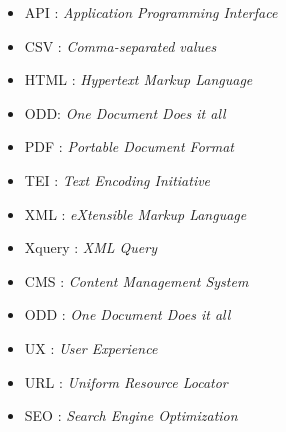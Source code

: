 \begin{itemize}
    \item API : \textit{Application Programming Interface}
    \item CSV : \textit{Comma-separated values}
    \item HTML : \textit{Hypertext Markup Language}
    \item ODD: \textit{One Document Does it all}
    \item PDF : \textit{Portable Document Format}
    \item TEI : \textit{Text Encoding Initiative}
    \item XML : \textit{eXtensible Markup Language}
    \item Xquery : \textit{XML Query}
    \item CMS : \textit{Content Management System}
    \item ODD : \textit{One Document Does it all}
    \item UX : \textit{User Experience}
    \item URL : \textit{Uniform Resource Locator}
    \item SEO : \textit{Search Engine Optimization}
\end{itemize}

\clearpage
\thispagestyle{empty}
